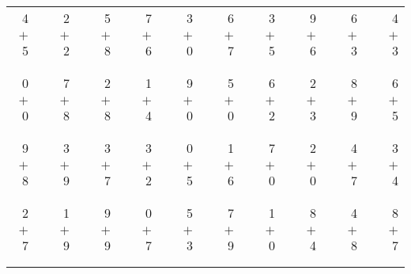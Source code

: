 \documentclass[12pt, letterpaper]{article}
\begin{document}
\begin{tabular}{rrrrrrrrrrrrrrrrrrr}
4 & & 2 & & 5 & & 7 & & 3 & & 6 & & 3 & & 9 & & 6 & & 4\\
$+$ 5 & & $+$ 2 & & $+$ 8 & & $+$ 6 & & $+$ 0 & & $+$ 7 & & $+$ 5 & & $+$ 6 & & $+$ 3 & & $+$ 3\\
\cline{1-1} \cline{3-3} \cline{5-5} \cline{7-7} \cline{9-9} \cline{11-11} \cline{13-13} \cline{15-15} \cline{17-17} \cline{19-19} \\ \\
0 & & 7 & & 2 & & 1 & & 9 & & 5 & & 6 & & 2 & & 8 & & 6\\
$+$ 0 & & $+$ 8 & & $+$ 8 & & $+$ 4 & & $+$ 0 & & $+$ 0 & & $+$ 2 & & $+$ 3 & & $+$ 9 & & $+$ 5\\
\cline{1-1} \cline{3-3} \cline{5-5} \cline{7-7} \cline{9-9} \cline{11-11} \cline{13-13} \cline{15-15} \cline{17-17} \cline{19-19} \\ \\
9 & & 3 & & 3 & & 3 & & 0 & & 1 & & 7 & & 2 & & 4 & & 3\\
$+$ 8 & & $+$ 9 & & $+$ 7 & & $+$ 2 & & $+$ 5 & & $+$ 6 & & $+$ 0 & & $+$ 0 & & $+$ 7 & & $+$ 4\\
\cline{1-1} \cline{3-3} \cline{5-5} \cline{7-7} \cline{9-9} \cline{11-11} \cline{13-13} \cline{15-15} \cline{17-17} \cline{19-19} \\ \\
2 & & 1 & & 9 & & 0 & & 5 & & 7 & & 1 & & 8 & & 4 & & 8\\
$+$ 7 & & $+$ 9 & & $+$ 9 & & $+$ 7 & & $+$ 3 & & $+$ 9 & & $+$ 0 & & $+$ 4 & & $+$ 8 & & $+$ 7\\
\cline{1-1} \cline{3-3} \cline{5-5} \cline{7-7} \cline{9-9} \cline{11-11} \cline{13-13} \cline{15-15} \cline{17-17} \cline{19-19} \\ \\
\end{tabular}
\newpage
\end{document}
